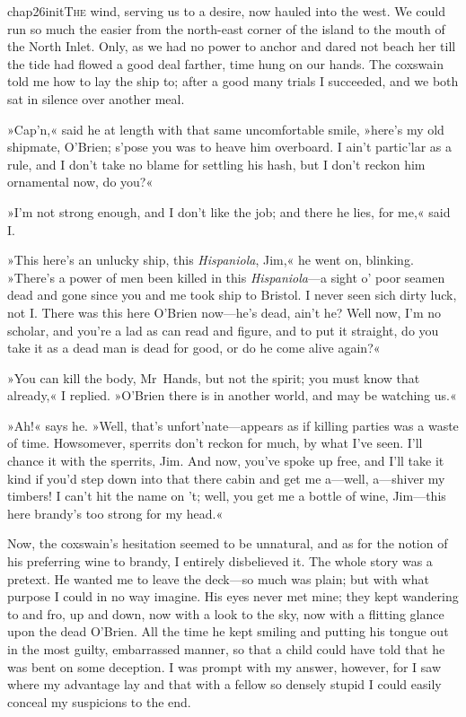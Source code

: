 
\lettrine[lines=5,image=true,findent=2pt]{chap26initT}{he} wind, serving us to a desire, now hauled into the west. We could run so much the easier from the north-east corner of the island to the mouth of the North Inlet. Only, as we had no power to anchor and dared not beach her till the tide had flowed a good deal farther, time hung on our hands. The coxswain told me how to lay the ship to; after a good many trials I succeeded, and we both sat in silence over another meal.

»Cap'n,« said he at length with that same uncomfortable smile, »here's my old shipmate, O'Brien; s'pose you was to heave him overboard. I ain't partic'lar as a rule, and I don't take no blame for settling his hash, but I don't reckon him ornamental now, do you?«

»I'm not strong enough, and I don't like the job; and there he lies, for me,« said I.

»This here's an unlucky ship, this \textit{Hispaniola}, Jim,« he went on, blinking. »There's a power of men been killed in this \textit{Hispaniola}—a sight o' poor seamen dead and gone since you and me took ship to Bristol. I never seen sich dirty luck, not I. There was this here O'Brien now—he's dead, ain't he? Well now, I'm no scholar, and you're a lad as can read and figure, and to put it straight, do you take it as a dead man is dead for good, or do he come alive again?«

»You can kill the body, Mr~Hands, but not the spirit; you must know that already,« I replied. »O'Brien there is in another world, and may be watching us.«

»Ah!« says he. »Well, that's unfort'nate—appears as if killing parties was a waste of time. Howsomever, sperrits don't reckon for much, by what I've seen. I'll chance it with the sperrits, Jim. And now, you've spoke up free, and I'll take it kind if you'd step down into that there cabin and get me a—well, a—shiver my timbers! I can't hit the name on 't; well, you get me a bottle of wine, Jim—this here brandy's too strong for my head.«

Now, the coxswain's hesitation seemed to be unnatural, and as for the notion of his preferring wine to brandy, I entirely disbelieved it. The whole story was a pretext. He wanted me to leave the deck—so much was plain; but with what purpose I could in no way imagine. His eyes never met mine; they kept wandering to and fro, up and down, now with a look to the sky, now with a flitting glance upon the dead O'Brien. All the time he kept smiling and putting his tongue out in the most guilty, embarrassed manner, so that a child could have told that he was bent on some deception. I was prompt with my answer, however, for I saw where my advantage lay and that with a fellow so densely stupid I could easily conceal my suspicions to the end.

